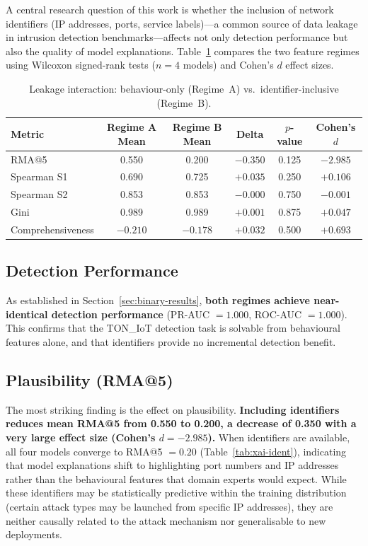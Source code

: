 \documentclass[12pt,a4paper]{report}
\begin{document}
A central research question of this work is whether the inclusion of network identifiers (IP addresses, ports, service labels)---a common source of data leakage in intrusion detection benchmarks---affects not only detection performance but also the quality of model explanations. Table~\ref{tab:leakage} compares the two feature regimes using Wilcoxon signed-rank tests ($n = 4$ models) and Cohen's $d$ effect sizes.

\begin{table}[H]
\centering
\caption{Leakage interaction: behaviour-only (Regime~A) vs.\ identifier-inclusive (Regime~B).}
\label{tab:leakage}
\begin{tabular}{lccccc}
\toprule
\textbf{Metric} & \textbf{Regime A Mean} & \textbf{Regime B Mean} & \textbf{Delta} & \textbf{$p$-value} & \textbf{Cohen's $d$} \\
\midrule
RMA@5 & 0.550 & 0.200 & $-0.350$ & 0.125 & $-2.985$ \\
Spearman S1 & 0.690 & 0.725 & $+0.035$ & 0.250 & $+0.106$ \\
Spearman S2 & 0.853 & 0.853 & $-0.000$ & 0.750 & $-0.001$ \\
Gini & 0.989 & 0.989 & $+0.001$ & 0.875 & $+0.047$ \\
Comprehensiveness & $-0.210$ & $-0.178$ & $+0.032$ & 0.500 & $+0.693$ \\
\bottomrule
\end{tabular}
\end{table}

\subsection*{Detection Performance}

As established in Section~\ref{sec:binary-results}, \textbf{both regimes achieve near-identical detection performance} (PR-AUC $= 1.000$, ROC-AUC $= 1.000$). This confirms that the TON\_IoT detection task is solvable from behavioural features alone, and that identifiers provide no incremental detection benefit.

\subsection*{Plausibility (RMA@5)}

The most striking finding is the effect on plausibility. \textbf{Including identifiers reduces mean RMA@5 from 0.550 to 0.200, a decrease of 0.350 with a very large effect size (Cohen's $d = -2.985$).} When identifiers are available, all four models converge to RMA@5 $= 0.20$ (Table~\ref{tab:xai-ident}), indicating that model explanations shift to highlighting port numbers and IP addresses rather than the behavioural features that domain experts would expect. While these identifiers may be statistically predictive within the training distribution (certain attack types may be launched from specific IP addresses), they are neither causally related to the attack mechanism nor generalisable to new deployments.
\end{document}
